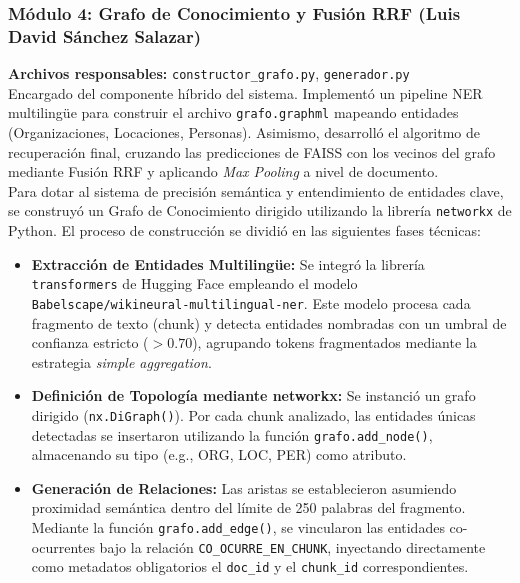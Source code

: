 \documentclass[12pt,a4paper]{article}
\begin{document}
\subsubsection{Módulo 4: Grafo de Conocimiento y Fusión RRF (Luis David Sánchez Salazar)}
\textbf{Archivos responsables:} \texttt{constructor\_grafo.py}, \texttt{generador.py}\\
Encargado del componente híbrido del sistema. Implementó un pipeline NER multilingüe para construir el archivo \texttt{grafo.graphml} mapeando entidades (Organizaciones, Locaciones, Personas). Asimismo, desarrolló el algoritmo de recuperación final, cruzando las predicciones de FAISS con los vecinos del grafo mediante Fusión RRF y aplicando \textit{Max Pooling} a nivel de documento.\\

Para dotar al sistema de precisión semántica y entendimiento de entidades clave, se construyó un Grafo de Conocimiento dirigido utilizando la librería \texttt{networkx} de Python. El proceso de construcción se dividió en las siguientes fases técnicas:

\begin{itemize}
    \item \textbf{Extracción de Entidades Multilingüe:} Se integró la librería \texttt{transformers} de Hugging Face empleando el modelo \texttt{Babelscape/wikineural-multilingual-ner}. Este modelo procesa cada fragmento de texto (chunk) y detecta entidades nombradas con un umbral de confianza estricto ($> 0.70$), agrupando tokens fragmentados mediante la estrategia \textit{simple aggregation}.
    \item \textbf{Definición de Topología mediante networkx:} Se instanció un grafo dirigido (\texttt{nx.DiGraph()}). Por cada chunk analizado, las entidades únicas detectadas se insertaron utilizando la función \texttt{grafo.add\_node()}, almacenando su tipo (e.g., ORG, LOC, PER) como atributo.
    \item \textbf{Generación de Relaciones:} Las aristas se establecieron asumiendo proximidad semántica dentro del límite de 250 palabras del fragmento. Mediante la función \texttt{grafo.add\_edge()}, se vincularon las entidades co-ocurrentes bajo la relación \texttt{CO\_OCURRE\_EN\_CHUNK}, inyectando directamente como metadatos obligatorios el \texttt{doc\_id} y el \texttt{chunk\_id} correspondientes.
\end{itemize}
\end{document}
